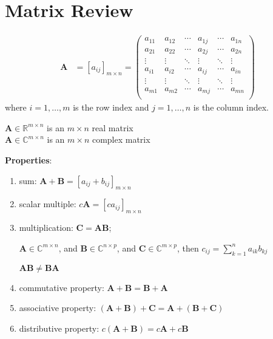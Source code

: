 \documentclass[12pt]{article}
\newcommand{\ve}[1]{\ensuremath{\mathbf{#1}}}
\begin{document}
\section*{Matrix Review}

\begin{align}
    \ve{A} &= [a_{ij}]_{m\times n}   =    \begin{pmatrix}
      a_{11} & a_{12} & \cdots & a_{1j} & \cdots & a_{1n} \\
      a_{21} & a_{22} & \cdots & a_{2j} & \cdots & a_{2n} \\
       \vdots & \vdots & \ddots & \vdots & \ddots   & \vdots \\     
      a_{i1} & a_{i2} & \cdots & a_{ij} & \cdots & a_{in} \\
      \vdots & \vdots & \ddots & \vdots & \ddots   & \vdots \\
      a_{m1} & a_{m2} & \cdots & a_{mj} & \cdots & a_{mn} \\
    \end{pmatrix} \nonumber   
\end{align} 
%
where $i = 1, \dots, m$ is the row index and $j = 1, \dots, n$ is the column index.

$\ve{A} \in \mathbb{R}^{m \times n}$ is an $m \times n$ real matrix\\
$\ve{A} \in \mathbb{C}^{m \times n}$ is an $m \times n$ complex matrix

\textbf{Properties}:
%
\begin{enumerate}
\item sum: $\ve{A} + \ve{B} = [a_{ij} + b_{ij}]_{m \times n}$

\item scalar multiple: $c\ve{A} = [c a_{ij}]_{m \times n}$

\item multiplication: $\ve{C} = \ve{A}\ve{B}$;

$\ve{A} \in \mathbb{C}^{m \times n}$, and $\ve{B} \in \mathbb{C}^{n \times p}$, and $\ve{C} \in \mathbb{C}^{m \times p}$, then $c_{ij} = \sum_{k=1}^n a_{ik} b_{kj}$

$\ve{A}\ve{B} \neq \ve{B}\ve{A}$

\item commutative property: $\ve{A} + \ve{B} = \ve{B} + \ve{A}$

\item associative property: $(\ve{A} + \ve{B}) + \ve{C} = \ve{A} + (\ve{B} + \ve{C})$

\item distributive property: $c(\ve{A} + \ve{B}) = c\ve{A} + c\ve{B}$

\end{enumerate}
\end{document}
